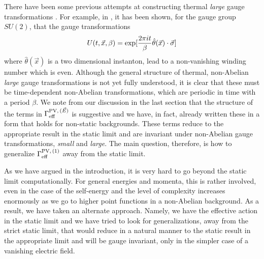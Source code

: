 \documentclass[a4paper,12pt]{article}
\begin{document}
There have been some previous attempts at constructing  thermal {\it
  large} gauge transformations \cite{Pisarski:1987gq,dunne:2001}. For
  example,  in
  \cite{Pisarski:1987gq} , it has been shown,
for the gauge group $SU(2)$, that the gauge transformations
\begin{equation}
U(t,\vec{x},\beta) = \exp [{2\pi i t\over \beta}
\hat{\theta}(\vec{x})\cdot\vec{\sigma} ]
\end{equation}
where $\hat{\theta}(\vec{x})$ is a two dimensional instanton, lead to
a non-vanishing winding number which is even. Although the general
structure of thermal, non-Abelian {\it large} gauge transformations is not yet
fully understood, it is clear that these must be time-dependent
non-Abelian transformations, which are periodic in time with a period
$\beta$. We note from our discussion in the last section that the
structure of the terms in $\Gamma_{\rm eff}^{{\rm PV},\,(\vec{E})}$ is
suggestive and we have, in fact, already written these in a form that
holds for non-static backgrounds. These terms reduce to the
appropriate result in the static limit and are invariant under
non-Abelian gauge transformations, {\it small} and {\it large}. The
main question, therefore, is how to generalize $\Gamma_{\rm eff}^{{\rm
    PV},\,(1)}$ away from the static limit.

As we have argued in the introduction, it is very hard to go beyond
the static limit computationally. For general energies and momenta,
this is rather involved, even in the case of the self-energy
\cite{Brandt:2000dd} and the  level of complexity 
increases enormously as we go to higher point functions in a
non-Abelian background. 
As a result, we have taken an alternate approach. Namely, we have the
effective action in the static limit and we have tried to look for
generalizations, away from the strict static limit, that would reduce
in a natural manner to the static result in the appropriate limit and
will be gauge invariant, only in the simpler case of a vanishing
electric field. 
\end{document}
